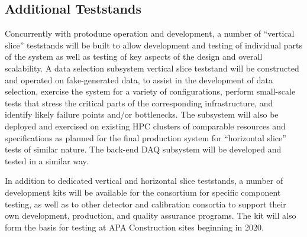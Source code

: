 


\subsection{Additional Teststands}
\label{sec:sp-daq:validation-demonstrators}

Concurrently with protodune operation and development, a number of
``vertical slice'' teststands will be built to allow 
development and testing of individual parts of the  system
as well as testing of key aspects of the design and overall
scalability. A data selection subsystem vertical slice teststand will be
constructed and operated on fake-generated data, to assist in the
development of data selection, exercise the system for a variety of
configurations, perform small-scale tests that stress the critical
parts of the corresponding infrastructure, 
and identify likely failure points and/or bottlenecks. The subsystem
will also be deployed and exercised on existing HPC clusters of
comparable resources and specifications as planned for the final
production system for ``horizontal slice'' tests of similar nature. The
back-end DAQ subsystem will be developed and tested in a similar way.

In addition to dedicated vertical and horizontal slice teststands, a number of
 development kits will be available for the consortium for
specific component testing, as well as to other detector and
calibration consortia to support their own development, production, and quality assurance programs. The  
kit will also form the basis for testing at APA Construction sites beginning in 2020. 

